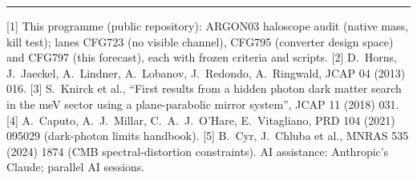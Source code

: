 \documentclass[10pt]{article}
\begin{document}
\vspace{4pt}\hrule\vspace{3pt}
{\footnotesize
[1] This programme (public repository): ARGON03 haloscope audit (native mass, kill test); lanes CFG723 (no visible channel), CFG795 (converter design space) and CFG797 (this forecast), each with frozen criteria and scripts.
[2] D.~Horns, J.~Jaeckel, A.~Lindner, A.~Lobanov, J.~Redondo, A.~Ringwald, JCAP 04 (2013) 016.
[3] S.~Knirck et al., ``First results from a hidden photon dark matter search in the meV sector using a plane-parabolic mirror system'', JCAP 11 (2018) 031.
[4] A.~Caputo, A.~J.~Millar, C.~A.~J.~O'Hare, E.~Vitagliano, PRD 104 (2021) 095029 (dark-photon limits handbook).
[5] B.~Cyr, J.~Chluba et al., MNRAS 535 (2024) 1874 (CMB spectral-distortion constraints).
AI assistance: Anthropic's Claude; parallel AI sessions.}
\end{document}
